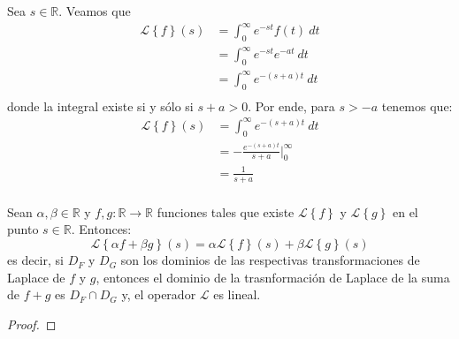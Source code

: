 \documentclass[12pt]{report}
\newcounter{it}
\theoremstyle{largebreak}
\newcommand\cf[3]{\ensuremath{#1:#2\rightarrow#3}}
\begin{document}
    \begin{sol}
        Sea $s\in\mathbb{R}$. Veamos que
        \begin{equation*}
            \begin{split}
                \mathcal{L}\left\{f\right\}(s)&=\int_0^{\infty}e^{-st}f(t)\:dt\\
                &=\int_0^{\infty}e^{-st}e^{ -at}\:dt\\
                &=\int_0^{\infty}e^{-(s+a)t}\:dt\\
            \end{split}
        \end{equation*}
        donde la integral existe si y sólo si $s+a>0$. Por ende, para $s>-a$ tenemos que:
        \begin{equation*}
            \begin{split}
                \mathcal{L}\left\{f\right\}(s)&=\int_0^{\infty}e^{-(s+a)t}\:dt\\
                &=-\frac{e^{-(s+a)t}}{s+a}\Big|_0^{\infty}\\
                &=\frac{1}{s+a}\\
            \end{split}
        \end{equation*}
    \end{sol}

    \begin{theor}
        Sean $\alpha,\beta\in\mathbb{R}$ y $\cf{f,g}{\mathbb{R}}{\mathbb{R}}$ funciones tales que existe $\mathcal{L}\left\{f\right\}$ y $\mathcal{L}\left\{g\right\}$ en el punto $s\in\mathbb{R}$. Entonces:
        \begin{equation*}
            \mathcal{L}\left\{\alpha f+\beta g \right\}(s)=\alpha\mathcal{L}\left\{f\right\}(s)+\beta\mathcal{L}\left\{g\right\}(s)
        \end{equation*}
        es decir, si $D_F$ y $D_G$ son los dominios de las respectivas transformaciones de Laplace de $f$ y $g$, entonces el dominio de la trasnformación de Laplace de la suma de $f+g$ es $D_F\cap D_G$ y, el operador $\mathcal{L}$ es lineal.
    \end{theor}

    \begin{proof}
        
    \end{proof}

\end{document}
